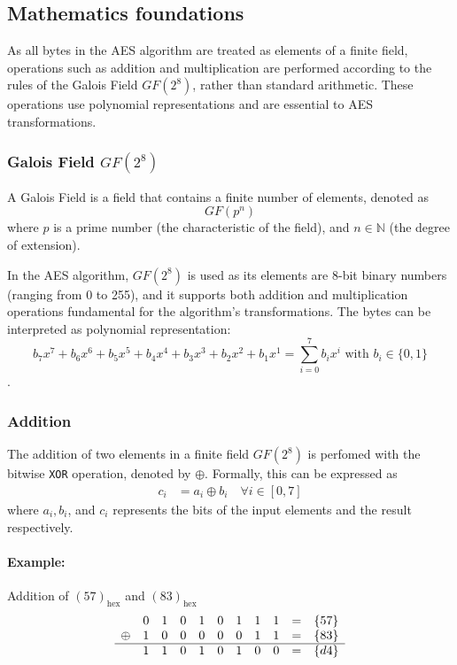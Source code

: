 \subsection{Mathematics foundations}

As all bytes in the \gls{AES} algorithm are treated as elements of a finite field, operations such as addition and multiplication are performed according to the rules of the Galois Field $GF(2^8)$, rather than standard arithmetic. 
These operations use polynomial representations and are essential to \gls{AES} transformations.


\subsubsection{Galois Field $GF(2^8)$}
\label{sec:gf}

A Galois Field is a field that contains a finite number of elements, denoted as
\begin{equation}
    GF(p^n)
\end{equation}
where $p$ is a prime number (the characteristic of the field), and $n \in \mathbb{N}$ (the degree of extension).

In the AES algorithm, $GF(2^8)$ is used as its elements are 8-bit binary numbers (ranging from 0 to 255), and it supports both addition and multiplication operations fundamental for the algorithm's transformations.
The bytes can be interpreted as polynomial representation:
\begin{equation}
    b_7 x^7 + b_6 x^6 + b_5 x^5 + b_4 x^4 + b_3 x^3 + b_2 x^2 + b_1 x^1 = \sum_{i=0}^7 b_i x^i \text{ with } b_i \in \{0,1\}
    \label{eq:gf2^8}
\end{equation}.


\subsubsection{Addition}
\label{sec:addition}

The addition of two elements in a finite field $GF(2^8)$ is perfomed with the bitwise \texttt{XOR} operation, denoted by $\oplus$.
Formally, this can be expressed as
\begin{align}
    c_i &= a_i \oplus b_i \quad \forall i \in [0, 7]
\end{align}
where $a_i, b_i$, and $c_i$ represents the bits of the input elements and the result respectively.


\paragraph{Example:} Addition of $(57)_{\text{hex}}$ and $(83)_{\text{hex}}$
\[
\begin{array}{ccccccccccc}
     & 0 & 1 & 0 & 1 & 0 & 1 & 1 & 1 & = & \{57\} \\
\oplus & 1 & 0 & 0 & 0 & 0 & 0 & 1 & 1 & = & \{83\} \\
\hline
     & 1 & 1 & 0 & 1 & 0 & 1 & 0 & 0 & = & \{d4\} \\
\end{array}
\]

